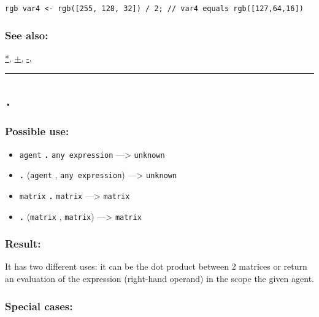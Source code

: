 \documentclass[]{book}
\providecommand{\tightlist}{%
  \setlength{\itemsep}{0pt}\setlength{\parskip}{0pt}}
\theoremstyle{definition}
\theoremstyle{definition}
\theoremstyle{definition}
\theoremstyle{remark}
\begin{document}
\begin{verbatim}
 
rgb var4 <- rgb([255, 128, 32]) / 2; // var4 equals rgb([127,64,16])
\end{verbatim}

\subsubsection{See also:}\label{see-also-5}

\href{operators-a-to-a.html\#*}{*}, \href{operators-a-to-a.html\#+}{+},
\href{operators-a-to-a.html\#-}{-},

\begin{center}\rule{0.5\linewidth}{\linethickness}\end{center}

\subsection{\texorpdfstring{\texttt{.}}{.}}\label{section-7}

\subsubsection{Possible use:}\label{possible-use-7}

\begin{itemize}
\tightlist
\item
  \texttt{agent} \textbf{\texttt{.}} \texttt{any\ expression}
  ---\textgreater{} \texttt{unknown}
\item
  \textbf{\texttt{.}} (\texttt{agent} , \texttt{any\ expression})
  ---\textgreater{} \texttt{unknown}
\item
  \texttt{matrix} \textbf{\texttt{.}} \texttt{matrix} ---\textgreater{}
  \texttt{matrix}
\item
  \textbf{\texttt{.}} (\texttt{matrix} , \texttt{matrix})
  ---\textgreater{} \texttt{matrix}
\end{itemize}

\subsubsection{Result:}\label{result-6}

It has two different uses: it can be the dot product between 2 matrices
or return an evaluation of the expression (right-hand operand) in the
scope the given agent.

\subsubsection{Special cases:}\label{special-cases-4}
\end{document}
